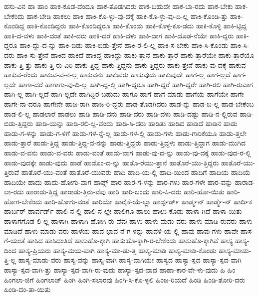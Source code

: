 {ಹಸು-ವಿನ
ಹಾ
ಹಾಂ
ಹಾಕ-ಕೂಡ-ದೆಂದೂ
ಹಾಕ-ತೊಡಗಿದರು
ಹಾಕ-ಬಹುದೇ
ಹಾಕ-ಬಾ-ರದು
ಹಾಕ-ಬೇಕು
ಹಾಕ-ಬೇಕೆಂದು
ಹಾಕ-ಬೇಡಿ
ಹಾಕಲು
ಹಾಕಿ
ಹಾಕಿ-ಕೊ-ಳ್ಳು-ವು-ದಕ್ಕೆ
ಹಾಕಿ-ಕೊ-ಳ್ಳು-ವು-ದಿ-ಲ್ಲ
ಹಾಕಿ-ಕೊಂಡಿ-ತ್ತು
ಹಾಕಿ-ಕೊಂಡಿದ್ದ
ಹಾಕಿ-ಕೊಂಡಿದ್ದರು
ಹಾಕಿ-ಕೊಂಡಿದ್ದರೂ
ಹಾಕಿ-ಕೊಂಡು
ಹಾಕಿ-ಕೊಳ್ಳ-ಕೂ-ಡದು
ಹಾಕಿ-ಕೊಳ್ಳಿ
ಹಾಕಿ-ಟ್ಟಿದ್ದ
ಹಾಕಿ-ದ-ವಳು
ಹಾಕಿ-ದಂತೆ
ಹಾಕಿ-ದರು
ಹಾಕಿ-ದರೆ
ಹಾಕಿ-ದಳು
ಹಾಕಿ-ದಾಗ
ಹಾಕಿ-ದೊಡ-ನೆಯೇ
ಹಾಕಿ-ದ್ದರು
ಹಾಕಿ-ದ್ದರೂ
ಹಾಕಿ-ದ್ದು-ದ-ನ್ನು
ಹಾಕಿ-ಬಿಡು
ಹಾಕಿ-ಬಿಡು-ತ್ತೇನೆ
ಹಾಕಿ-ರ-ಲಿ-ಲ್ಲ
ಹಾಕಿ-ಸ-ಬೇಕು
ಹಾಕಿ-ಸಿ-ಕೊಂಡು
ಹಾಕಿ-ಸಿ-ದರು
ಹಾಕಿ-ಸು-ತ್ತೇನೆ
ಹಾಕಿದ
ಹಾಕಿದೆ
ಹಾಕಿದ್ದ
ಹಾಕಿದ್ದು
ಹಾಕು-ತ್ತಾನೆ
ಹಾಕು-ತ್ತಾರೆ
ಹಾಕು-ತ್ತಾರೆಯೇ
ಹಾಕು-ತ್ತಾರೆಯೊ
ಹಾಕು-ತ್ತಿ-ತ್ತು
ಹಾಕು-ತ್ತಿ-ರು-ವಿರಿ
ಹಾಕು-ತ್ತಿದ್ದ
ಹಾಕು-ತ್ತಿದ್ದನು
ಹಾಕು-ತ್ತಿದ್ದರು
ಹಾಕು-ತ್ತೇನೆ
ಹಾಕು-ವು-ದಕ್ಕೆ
ಹಾಕುವ
ಹಾಕುವ-ರೆಂದು
ಹಾಕುವ-ವ-ನ-ಲ್ಲ
ಹಾಕುವನು
ಹಾಕುವರು
ಹಾಕುವುದು
ಹಾಕುವುದೇ
ಹಾಗ-ಲ್ಲ
ಹಾಗ-ಲ್ಲದೆ
ಹಾಗ-ಲ್ಲದೇ
ಹಾಗಾ-ದರೆ
ಹಾಗಾಗು-ವು-ದಿ-ಲ್ಲ
ಹಾಗಿ-ದ್ದ-ಲ್ಲಿ
ಹಾಗಿ-ದ್ದರೂ
ಹಾಗಿ-ದ್ದರೆ
ಹಾಗಿ-ದ್ದರೇ
ಹಾಗಿ-ರಲಿ
ಹಾಗಿ-ರುವಾಗ
ಹಾಗಿ-ಲ್ಲ
ಹಾಗಿ-ಲ್ಲದೆ
ಹಾಗಿ-ಲ್ಲದೇ
ಹಾಗಿದ್ದಿರ-ಬಹುದು
ಹಾಗೂ
ಹಾಗೆ
ಹಾಗೆ-ಮಾಡು
ಹಾಗೆಯೆ
ಹಾಗೆಯೇ
ಹಾಗೇ
ಹಾಗೇ-ನಾ-ದರೂ
ಹಾಗೇನೇ
ಹಾಜ-ರಾಗಿ
ಹಾಜ-ರಿ-ದ್ದರು
ಹಾಡ-ತೊಡಗಿದರು
ಹಾಡ-ನ್ನು
ಹಾಡ-ಬ-ಲ್ಲ
ಹಾಡ-ಬೇಕೆಂಬ
ಹಾಡ-ಲಿ-ಲ್ಲ
ಹಾಡಲಾರೆ
ಹಾಡಲು
ಹಾಡಿ
ಹಾಡಿ-ದನು
ಹಾಡಿ-ದರು
ಹಾಡಿ-ದಳು
ಹಾಡಿ-ದಷ್ಟು
ಹಾಡಿ-ನ-ಲ್ಲಿರುವ
ಹಾಡಿ-ಬಿಡು-ತ್ತಿದ್ದರು
ಹಾಡಿ-ಯನ್ನು
ಹಾಡಿ-ರಲಿ-ಲ್ಲ-ವೆಂದು
ಹಾಡಿ-ಸಿ-ದರು
ಹಾಡಿತು
ಹಾಡಿದ
ಹಾಡಿದೆ
ಹಾಡಿನ
ಹಾಡು
ಹಾಡು-ಗ-ಳನ್ನು
ಹಾಡು-ಗ-ಳಿಗೆ
ಹಾಡು-ಗಳ-ನ್ನೆ-ಲ್ಲ
ಹಾಡು-ಗಳ-ಲ್ಲಿ
ಹಾಡು-ಗಳು
ಹಾಡು-ಗಾರಿಕೆಯೂ
ಹಾಡು-ತ್ತಲೇ
ಹಾಡು-ತ್ತಾರೆ
ಹಾಡು-ತ್ತಿದ್ದ
ಹಾಡು-ತ್ತಿದ್ದ-ವ-ನನ್ನು
ಹಾಡು-ತ್ತಿದ್ದರು
ಹಾಡು-ತ್ತಿದ್ದಳು
ಹಾಡು-ತ್ತಿದ್ದಾಗ
ಹಾಡು-ಮುಗಿದ
ಹಾಡು-ವ-ವನು
ಹಾಡು-ವ-ವರು
ಹಾಡು-ವಂತೆ
ಹಾಡು-ವಾಗ
ಹಾಡು-ವು-ದ-ನ್ನು
ಹಾಡು-ವು-ದಕ್ಕೆ
ಹಾಡು-ವುದ-ರ-ಲ್ಲಿ
ಹಾಡು-ವುದಕ್ಕೇ
ಹಾಡು-ವುದು
ಹಾಡೆ
ಹಾಡೊಂ-ದ-ನ್ನು
ಹಾತೊ-ರೆಯು-ತ್ತಾನೆ
ಹಾತೊರೆ-ಯು-ತ್ತಿದ್ದರು
ಹಾತೊರೆ-ಯು-ತ್ತಿರುವೆ
ಹಾತೊರೆ-ಯು-ವಂತೆ
ಹಾತೊರೆ-ಯುವರು
ಹಾದಿ
ಹಾದಿ-ಯ-ಲ್ಲಿ
ಹಾದಿ-ಯಿಂದ
ಹಾದಿಗೆ
ಹಾದಿಯ
ಹಾದಿಯೆ
ಹಾದಿಯೇ
ಹಾದು
ಹಾದು-ಹೋಗು-ವಾಗ
ಹಾಪ್ಸ್
ಹಾರ
ಹಾರ-ಗ-ಳನ್ನು
ಹಾರ-ಗಳು
ಹಾರ-ಗಳೇ
ಹಾರ-ವನ್ನು
ಹಾರಾಡ-ಲಾ-ರದು
ಹಾರಾಡು-ತ್ತಿದ್ದ
ಹಾರಾಡು-ತ್ತಿರು-ವೆವು
ಹಾರಿ
ಹಾರಿ-ಬಂದು
ಹಾರಿ-ಸಿ-ದರು
ಹಾರಿ-ಹೋ-ಯಿತು
ಹಾರಿ-ಹೋಗ-ಬೇಕೆಂದು
ಹಾರಿ-ಹೋಗು-ವಂತೆ
ಹಾರಿಯೇ
ಹಾರೈಕೆ-ಯೆ-ಲ್ಲಾ
ಹಾರ್ಡ್ಫರ್ಡ್
ಹಾರ್ಡ್ಮನ್
ಹಾರ್ಡ್ಮೆ-ನ್
ಹಾರ್ದಿಕ
ಹಾರ್ಬರ್
ಹಾರ್ವರ್ಡ್
ಹಾಲಿ-ನ-ಲ್ಲಿ
ಹಾಲಿ-ನ-ಲ್ಲೇ
ಹಾಲಿಗೂ
ಹಾಲು
ಹಾಲು-ಕೊಡು
ಹಾಳಾ-ಗಿದೆ
ಹಾಳಾ-ಯಿತು
ಹಾಳಾಗಗೊಡ-ಲಿ-ಲ್ಲ
ಹಾಳಾಗಿ
ಹಾಳಾಗಿ-ಹೋಗಿ-ರು-ವೆವು
ಹಾಳು
ಹಾಳು-ಮಡು-ವರು
ಹಾಳು-ಮಾಡಿ-ರುವರು
ಹಾಳು-ಮಾಡಿದೆ
ಹಾಳು-ಮಾಡು-ವರು
ಹಾಳೆಯ
ಹಾವ-ಭಾವ-ನೆ-ಗ-ಳನ್ನು
ಹಾವಳಿ-ಯ-ಲ್ಲಿ
ಹಾವು
ಹಾವು-ಗಳು
ಹಾವೇ
ಹಾಸ-ಗೆ-ಯಂತೆ
ಹಾಸಿದ
ಹಾಸಿದಂತಿದೆ
ಹಾಸುಹೊ-ಕ್ಕಾಗಿ
ಹಾಸುಹೊ-ಕ್ಕಾಗಿ-ರ-ಬೇಕೆಂದು
ಹಾಸುಹೊ-ಕ್ಕಾಗಿವೆ
ಹಾಸ್ಯ
ಹಾಸ್ಯ-ದಿಂದ
ಹಾಸ್ಯ-ಪ್ರಿಯರು
ಹಾಸ್ಯ-ಮಯ-ವಾಗಿ
ಹಾಸ್ಯ-ಮಾ-ಡು-ತ್ತ
ಹಾಸ್ಯ-ಮಾಡಿ
ಹಾಸ್ಯ-ಮಾಡಿ-ಕೊಂಡು
ಹಾಸ್ಯ-ಮಾಡು-ತ್ತಿ-ಲ್ಲ
ಹಾಸ್ಯ-ಮಾಡು-ವರು
ಹಾಸ್ಯ-ವನ್ನು
ಹಾಸ್ಯ-ವಾಗಿ
ಹಾಸ್ಯ-ವಾಗಿಯೇ
ಹಾಸ್ಯದ
ಹಾಸ್ಯಾ-ಸ್ಪದ
ಹಾಸ್ಯಾ-ಸ್ಪದ-ವಾಗಿ
ಹಾಸ್ಯಾ-ಸ್ಪದ-ವಾಗಿ-ತ್ತು
ಹಾಸ್ಯಾ-ಸ್ಪದ-ವಾಗಿ-ರು-ವುದು
ಹಾಸ್ಯಾ-ಸ್ಪದ-ವಾದ
ಹಾಹಾ-ಕಾರ-ವೇ-ಳು-ವುದು
ಹಿ
ಹಿಂ
ಹಿಂಗಲಾ-ಜಿಗೆ
ಹಿಂಗಲಾಜ್
ಹಿಂಗಿ
ಹಿಂಗಿ-ಸಲಾರವು
ಹಿಂಗಿ-ಸಿ-ಕೊ-ಳ್ಳಲಿ
ಹಿಂಜ-ರಿಯದೆ
ಹಿಂಡಿ
ಹಿಂಡಿ-ತೋರಿ-ದರು
ಹಿಂಡಿ-ದಂ-ತಾ-ಯಿತು
}

